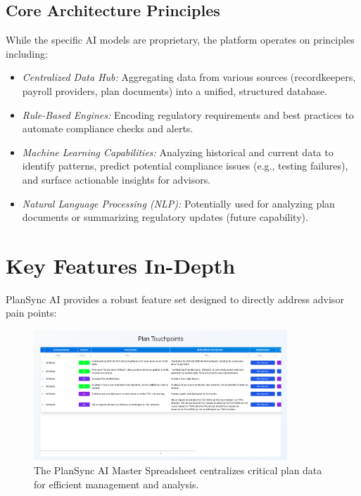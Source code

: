 \documentclass[11pt]{article} %
\begin{document}
\subsection{Core Architecture Principles}
While the specific AI models are proprietary, the platform operates on principles including:
\begin{itemize}[leftmargin=*]
    \item \textit{Centralized Data Hub:} Aggregating data from various sources (recordkeepers, payroll providers, plan documents) into a unified, structured database.
    \item \textit{Rule-Based Engines:} Encoding regulatory requirements and best practices to automate compliance checks and alerts.
    \item \textit{Machine Learning Capabilities:} Analyzing historical and current data to identify patterns, predict potential compliance issues (e.g., testing failures), and surface actionable insights for advisors.
    \item \textit{Natural Language Processing (NLP):} Potentially used for analyzing plan documents or summarizing regulatory updates (future capability).
\end{itemize}

\section{Key Features In-Depth}
PlanSync AI provides a robust feature set designed to directly address advisor pain points:

\begin{figure}[htbp]
    \centering
    \includegraphics[width=0.85\textwidth]{features.png}
    \caption{The PlanSync AI Master Spreadsheet centralizes critical plan data for efficient management and analysis.}
    \label{fig:features}
\end{figure}
\end{document}
